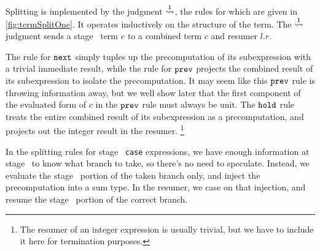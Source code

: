 Splitting is implemented by the judgment $\overset{ 1}\rightsquigarrow$,
the rules for which are given in \cref{fig:termSplitOne}.  
It operates inductively on the structure of the term.  
The $\overset{ 1}\rightsquigarrow$ judgment sends a stage \bbone\ term $e$ to a combined term
$c$ and resumer $l.r$. 

The rule for ${\tt next}$ simply tuples up the precomputation of its subexpression with a trivial immediate result,
while the rule for ${\tt prev}$ projects the combined result of its subexpression to isolate the precomputation.
It may seem like this ${\tt prev}$ rule is throwing information away, but we well show later that the first component 
of the evaluated form of $c$ in the ${\tt prev}$ rule must always be unit.
The ${\tt hold}$ rule treats the entire combined result of its subexpression as a precomputation, 
and projects out the integer result in the resumer.%
\footnote{The resumer of an integer expression is usually trivial, 
but we have to include it here for termination purposes.}

In the splitting rules for stage \bbone\ {\tt case} expressions, we
have enough information at stage \bbone\ to know what branch to take, so there's
no need to speculate. Instead, we evaluate the stage \bbone\ portion of the
taken branch only, and inject the precomputation into a sum type. In the
resumer, we case on that injection, and resume the stage \bbtwo\ portion of the
correct branch.

%
%


%


%
%
%

